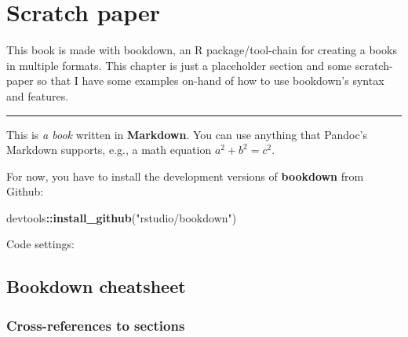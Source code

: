 \documentclass [11pt, proquest] {uwthesis}[2015/03/03]
\newenvironment{Shaded}{}{}
\newcommand{\KeywordTok}[1]{\textcolor[rgb]{0.00,0.44,0.13}{\textbf{{#1}}}}
\newcommand{\DataTypeTok}[1]{\textcolor[rgb]{0.56,0.13,0.00}{{#1}}}
\newcommand{\DecValTok}[1]{\textcolor[rgb]{0.25,0.63,0.44}{{#1}}}
\newcommand{\StringTok}[1]{\textcolor[rgb]{0.25,0.44,0.63}{{#1}}}
\newcommand{\OtherTok}[1]{\textcolor[rgb]{0.00,0.44,0.13}{{#1}}}
\newcommand{\NormalTok}[1]{{#1}}
\newcommand{\OperatorTok}[1]{\textcolor[rgb]{0.00,0.44,0.13}{\textbf{{#1}}}}
\begin{document}
\chapter{Scratch paper}\label{scratch-paper}

This book is made with bookdown, an R package/tool-chain for creating a
books in multiple formats. This chapter is just a placeholder section
and some scratch-paper so that I have some examples on-hand of how to
use bookdown's syntax and features.
\begin{center}\rule{0.5\linewidth}{\linethickness}\end{center}

This is \emph{a book} written in \textbf{Markdown}. You can use anything
that Pandoc's Markdown supports, e.g., a math equation
\(a^2 + b^2 = c^2\).

For now, you have to install the development versions of
\textbf{bookdown} from Github:
\begin{Shaded}
\begin{Highlighting}[]
\NormalTok{devtools}\OperatorTok{::}\KeywordTok{install_github}\NormalTok{(}\StringTok{"rstudio/bookdown"}\NormalTok{)}
\end{Highlighting}
\end{Shaded}
Code settings:
\begin{Shaded}
\end{Shaded}
\hypertarget{bookdown-cheatsheet}{\section{Bookdown
cheatsheet}\label{bookdown-cheatsheet}}

\hypertarget{manual-section-label-demo}{\subsection{Cross-references to
sections}\label{manual-section-label-demo}}
\end{document}
